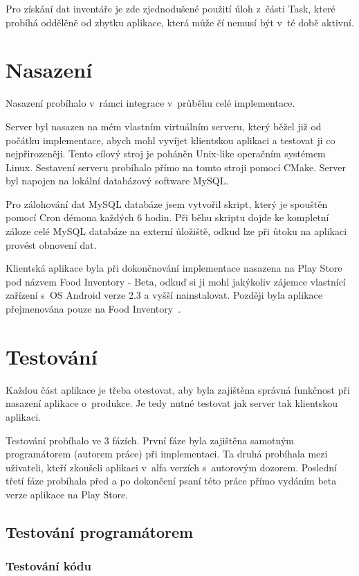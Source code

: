 \documentclass[thesis=B,czech]{FITthesis}[2013/10/20]
\begin{document}
Pro získání dat inventáře je zde zjednodušené použití úloh z~části Task, které probíhá oddělěně od zbytku aplikace, která může čí nemusí být v~té době aktivní.

\chapter{Nasazení}

Nasazení probíhalo v~rámci integrace v~průběhu celé implementace.

Server byl nasazen na mém vlastním virtuálním serveru, který běžel již od počátku implementace, abych mohl vyvíjet klientskou aplikaci a testovat ji co nejpřirozeněji. Tento cílový stroj je poháněn Unix-like operačním systémem Linux. Sestavení serveru probíhalo přímo na tomto stroji pomocí CMake. Server byl napojen na lokální databázový software MySQL. 

Pro zálohování dat MySQL databáze jsem vytvořil skript, který je spouštěn pomocí Cron démona každých 6 hodin. Při běhu skriptu dojde ke kompletní záloze celé MySQL databáze na externí ůložiště, odkud lze při ůtoku na aplikaci provést obnovení dat.

Klientská aplikace byla při dokončnování implementace nasazena na Play Store pod názvem Food Inventory - Beta, odkuď si ji mohl jakýkoliv zájemce vlastnící zařízení s~OS Android verze 2.3 a vyšší nainstalovat. Později byla aplikace přejmenována pouze na Food Inventory~\cite{food_inventory_playstore}.

\chapter{Testování}

Každou část aplikace je třeba otestovat, aby byla zajištěna správná funkčnost při nasazení aplikace o~produkce. Je tedy nutné testovat jak server tak klientskou aplikaci.

Testování probíhalo ve 3 fázích. První fáze byla zajištěna samotným programátorem (autorem práce) při implementaci. Ta druhá probíhala mezi uživateli, kteří zkoušeli aplikaci v~alfa verzích s~autorovým dozorem. Poslední třetí fáze probíhala před a po dokončení psaní této práce přímo vydáním beta verze aplikace na Play Store.

\section{Testování programátorem}

\subsection{Testování kódu}
\end{document}
